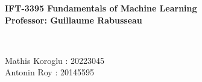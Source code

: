 \documentclass[11pt, french, english]{article}
\begin{document}
\setlength{\parskip}{0.3cm} \setlength{\parindent}{0cm}

\begin{center}
	\textbf{IFT-3395 Fundamentals of Machine Learning} \\
	\textbf{Professor: Guillaume Rabusseau }
	\par\end{center}{\large \par}

\begin{center}
	\textbf{\LARGE{}} \\
	\par\end{center}{\LARGE \par}
	
Mathis Koroglu : 20223045\\
Antonin Roy : 20145595



\begin{enumerate}
	
	
	
	

\end{enumerate}

\end{document}
